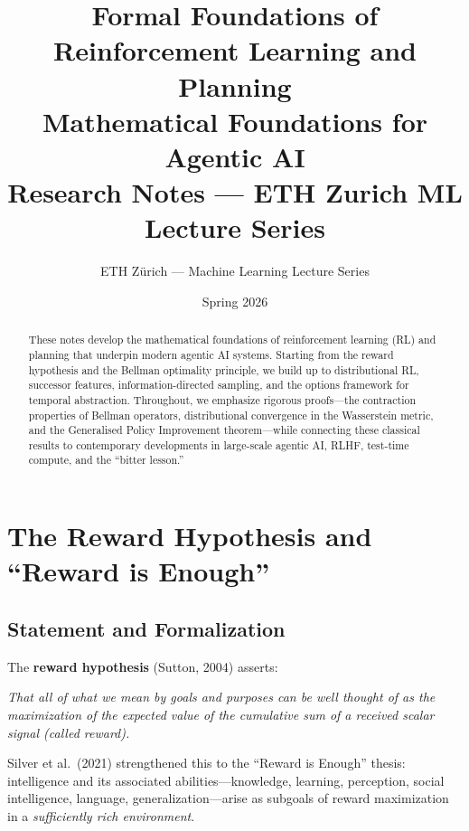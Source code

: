 \documentclass[11pt,a4paper]{article}
\title{\textbf{Formal Foundations of Reinforcement Learning and Planning} \\[4pt]
\Large Mathematical Foundations for Agentic AI \\[8pt]
\normalsize Research Notes --- ETH Zurich ML Lecture Series}
\author{ETH Z\"urich --- Machine Learning Lecture Series}
\date{Spring 2026}
\begin{document}
\maketitle

\begin{abstract}
These notes develop the mathematical foundations of reinforcement learning (RL) and planning
that underpin modern agentic AI systems. Starting from the reward hypothesis and the
Bellman optimality principle, we build up to distributional RL, successor features,
information-directed sampling, and the options framework for temporal abstraction.
Throughout, we emphasize rigorous proofs---the contraction properties of
Bellman operators, distributional convergence in the Wasserstein metric,
and the Generalised Policy Improvement theorem---while connecting these
classical results to contemporary developments in large-scale agentic AI,
RLHF, test-time compute, and the ``bitter lesson.''
\end{abstract}

\tableofcontents
\newpage

\section{The Reward Hypothesis and ``Reward is Enough''}
\label{sec:reward}

\subsection{Statement and Formalization}

The \textbf{reward hypothesis} (Sutton, 2004) asserts:

\begin{tcolorbox}[colback=blue!5!white, colframe=blue!60!black, title=The Reward Hypothesis]
\textit{That all of what we mean by goals and purposes can be well thought of as the maximization of the expected value of the cumulative sum of a received scalar signal (called reward).}
\end{tcolorbox}

Silver et al.\ (2021) strengthened this to the ``Reward is Enough'' thesis: intelligence
and its associated abilities---knowledge, learning, perception, social intelligence,
language, generalization---arise as subgoals of reward maximization in a
\emph{sufficiently rich environment}.
\end{document}
